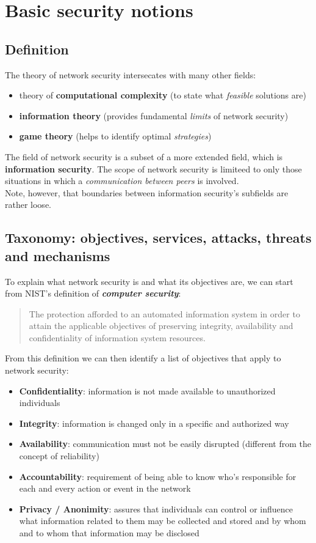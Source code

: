 \chapter{Basic security notions}
\section{Definition}
The theory of network security intersecates with many other fields:

\begin{itemize}
  \item theory of \textbf{computational complexity} (to state what
  \textit{feasible} solutions are)
\item \textbf{information theory} (provides fundamental \textit{limits} of network
  security)
\item \textbf{game theory} (helps to identify optimal \textit{strategies})
\end{itemize}

The field of network security is a subset of a more extended field, which is
\textbf{information security}. The scope of network security is limiteed to
only those situations in which a \textit{communication between peers} is
involved.\\
Note, however, that boundaries between information security's subfields are
rather loose.

\section{Taxonomy: objectives, services, attacks, threats and mechanisms}
To explain what network security is and what its objectives are, we can start
from NIST's definition of \textit{\textbf{computer security}}:

\begin{quote}
  The protection afforded to an automated information system in order to attain
  the applicable objectives of preserving integrity, availability and
  confidentiality of information system resources.
\end{quote}

From this definition we can then identify a list of objectives that apply to
network security:

\begin{itemize}
  \item \textbf{Confidentiality}: information is not made available to unauthorized
    individuals
  \item \textbf{Integrity}: information is changed only in a specific and authorized way
  \item \textbf{Availability}: communication must not be easily disrupted (different
    from the concept of reliability)
  \item \textbf{Accountability}: requirement of being able to know who's responsible for
    each and every action or event in the network
  \item \textbf{Privacy / Anonimity}: assures that individuals can control or influence
    what information related to them may be collected and stored and by whom
    and to whom that information may be disclosed
\end{itemize}

